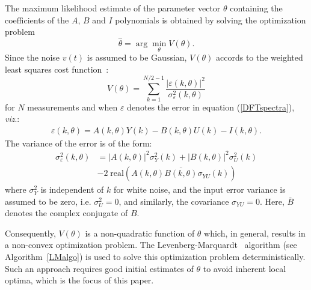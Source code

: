 The maximum likelihood estimate of the parameter vector $\theta$  containing the coefficients of the $A$, $B$ and $I$  polynomials is obtained by solving the optimization problem
\begin{equation}
  \hat{\theta} = \arg\min_\theta V(\theta) \text{.}
\end{equation}
Since the noise $v(t)$ is assumed to be Gaussian, $V(\theta)$ accords to the weighted least squares cost function~\citep[Section 9.11]{Pintelon2012}:
\begin{equation}\label{eq:MLEcf}
V(\theta) = \sum_{k=1}^{N/2-1}\frac{|\varepsilon(k,\theta)|^2}{\sigma_\varepsilon^2(k,\theta)}
\end{equation}
for $N$ measurements and when $\varepsilon$ denotes the error in equation (\ref{DFTspectra}),  \emph{viz}.:
\begin{align}
\varepsilon(k,\theta) = A(k,\theta)Y(k) - B(k,\theta)U(k) - I(k,\theta)\text{.}
\end{align}
The variance of the error is of the form:
\begin{equation}\label{eq:sigmaEps}
\begin{split}
\sigma_\varepsilon^2(k,\theta) 
  &=  |A(k,\theta)|^2\sigma_Y^2(k) 
   +  |B(k,\theta)|^2\sigma_U^2(k) \\
  &- 2\;\mathrm{real} \left( A(k,\theta) \overline{B(k,\theta)} \sigma_{YU}(k) \right)
\end{split}
\end{equation}
where $\sigma_Y^2$ is independent of $k$ for white noise, %
and the input error variance is assumed to be zero, i.e. $\sigma^2_U=0$, and similarly, the covariance $\sigma_{YU} = 0$.
Here, $\overline{B}$ denotes the complex conjugate of $B$.

Consequently, $V(\theta)$ is a non-quadratic function of $\theta$ which, in general, results in a non-convex optimization problem. 
The Levenberg-Marquardt~\citep{Marquardt1963} algorithm (see Algorithm~\ref{LMalgo}) is used to solve this optimization problem deterministically.
Such an approach requires good initial estimates of $\theta$ to avoid inherent local optima, which is the focus of this paper.


